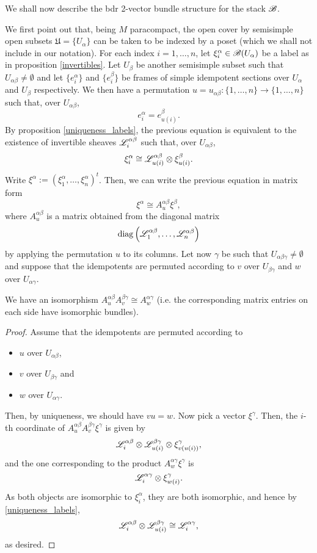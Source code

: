 We shall now describe the {\sc bdr} 2-vector bundle structure for the stack $\mathscr{B}$.

We first point out that, being $M$ paracompact, the open cover by semisimple open subsets $\mathfrak{U}=\{U_\alpha \}$ can be taken to be indexed by a poset (which we shall not include in our notation). For each index $i=1,\dots ,n$, let $\xi^\alpha_i \in \mathscr{B}(U_\alpha )$ be a label as in proposition \ref{invertibles}. Let $U_\beta$ be another semisimple subset such that $U_{\alpha \beta}\neq \emptyset$ and let $\{e_i^\alpha\}$ and $\{e_i^\beta\}$ be frames of simple idempotent sections over $U_\alpha$ and $U_\beta$ respectively. We then have a permutation $u=u_{\alpha \beta}:\{1,\dots ,n\}\to \{1,\dots ,n\}$ such that, over $U_{\alpha \beta}$,
$$e_i^\alpha =e_{u(i)}^\beta .$$
By proposition \ref{uniqueness_labels}, the previous equation is equivalent to the existence of invertible sheaves $\mathscr{L}^{\alpha \beta}_i$ such that, over $U_{\alpha \beta}$,
$$\xi_i^\alpha \cong \mathscr{L}^{\alpha \beta}_{u(i)}\otimes \xi_{u(i)}^\beta .$$
Write $\xi^\alpha :=(\xi_1^\alpha ,\dots ,\xi_n^\alpha )^t$. Then, we can write the previous equation in matrix form
\begin{equation}\label{mult_matrix}
\xi^\alpha \cong A^{\alpha \beta}_u \xi^\beta ,
\end{equation}
where $A^{\alpha \beta}_u$ is a matrix obtained from the diagonal matrix
$$\operatorname{diag}\left (\mathscr{L}^{\alpha \beta}_1,\dots ,\mathscr{L}^{\alpha \beta}_n\right )$$
by applying the permutation $u$ to its columns. Let now $\gamma$ be such that $U_{\alpha \beta \gamma}\neq \emptyset$ and suppose that the idempotents are permuted according to $v$ over $U_{\beta \gamma}$ and $w$ over $U_{\alpha \gamma}$.

\begin{lemma}
We have an isomorphism $A^{\alpha \beta}_uA^{\beta \gamma}_v\cong A^{\alpha \gamma}_w$ (i.e. the corresponding matrix entries on each side have isomorphic bundles).
\end{lemma} 
\begin{proof}
Assume that the idempotents are permuted according to
\begin{itemize}
\item $u$ over $U_{\alpha \beta}$,
\item $v$ over $U_{\beta \gamma}$ and
\item $w$ over $U_{\alpha \gamma}$.
\end{itemize}
Then, by uniqueness, we should have $vu=w$. Now pick a vector $\xi^\gamma$. Then, the $i$-th coordinate of $A^{\alpha \beta}_uA^{\beta \gamma}_v\xi^\gamma$ is given by
$$\mathscr{L}_i^{\alpha \beta }\otimes \mathscr{L}_{u(i)}^{\beta \gamma }\otimes \xi_{v(u(i))}^\gamma ,$$
and the one corresponding to the product $A^{\alpha \gamma}_w\xi^\gamma$ is
$$\mathscr{L}^{\alpha \gamma}_i\otimes \xi_{w(i)}^\gamma .$$
As both objects are isomorphic to $\xi_i^\alpha$, they are both isomorphic, and hence by \ref{uniqueness_labels},
$$\mathscr{L}_i^{\alpha \beta }\otimes \mathscr{L}_{u(i)}^{\beta \gamma } \cong \mathscr{L}^{\alpha \gamma}_i,$$
as desired.
\end{proof}

